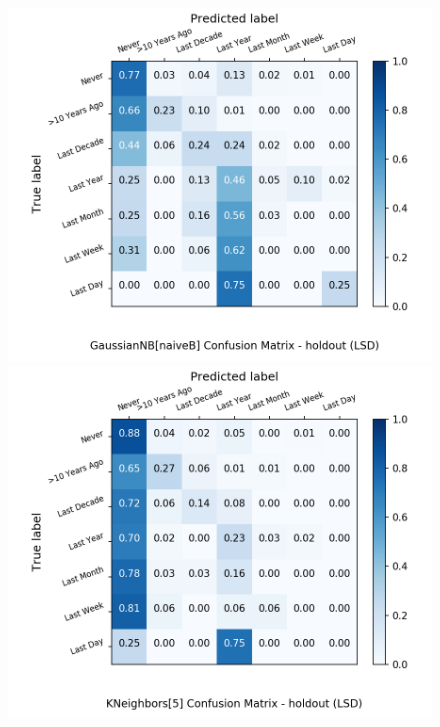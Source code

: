 \begin{figure}[H]
\begin{minipage}[b]{0.32\textwidth}
		\includegraphics[width=1.1\textwidth]{Plots/drugs/LSD_GaussianNB_naiveB_balance_False_holdout.png}
	\end{minipage}
	\begin{minipage}[b]{0.32\textwidth}
		\includegraphics[width=1.1\textwidth]{Plots/drugs/LSD_KNeighbors_5_balance_False_holdout.png}
  \end{minipage}
	\begin{minipage}[b]{0.32\textwidth}

\end{minipage}
\end{figure}
